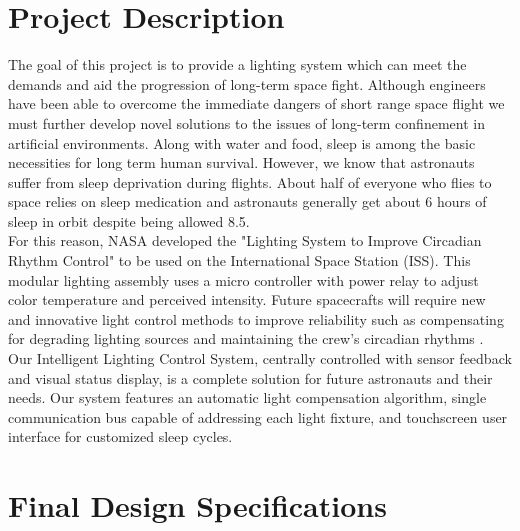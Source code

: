 \documentclass[12pt,a4paper]{report}
\begin{document}
\section{Project Description}
The goal of this project is to provide a lighting system which can meet the demands and aid the progression of long-term space fight. Although engineers have been able to overcome the immediate dangers of short range space flight we must further develop novel solutions to the issues of long-term confinement in artificial environments. Along with water and food, sleep is among the basic necessities for long term human survival. However, we know that astronauts suffer from sleep deprivation during flights. About half of everyone who flies to space relies on sleep medication and astronauts generally get about 6 hours of sleep in orbit despite being allowed 8.5.\cite{spacesleep}\\ \linebreak 
For this reason, NASA developed the "Lighting System to Improve Circadian Rhythm Control" to be used on the International Space Station (ISS). \cite{nasapatent} This modular lighting assembly uses a micro controller with power relay to adjust color temperature and perceived intensity. Future spacecrafts will require new and innovative light control methods to improve reliability such as compensating for degrading lighting sources and maintaining the crew's circadian rhythms \cite{tsgc}. \\ \linebreak
Our Intelligent Lighting Control System, centrally controlled with sensor feedback and visual status display, is a complete solution for future astronauts and their needs. Our system features an automatic light compensation algorithm, single communication bus capable of addressing each light fixture, and touchscreen user interface for customized sleep cycles. 



\section{Final Design Specifications}
\end{document}

